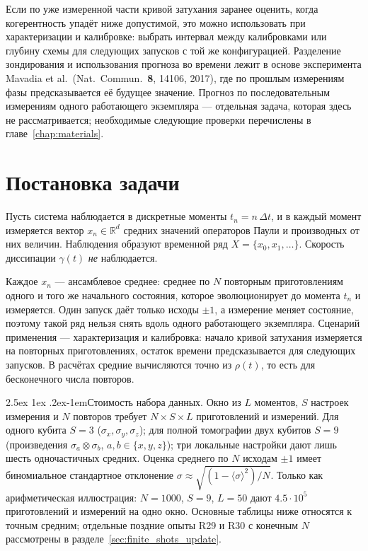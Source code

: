 \documentclass[12pt,a4paper]{report}
\makeatletter
\renewcommand\paragraph{\@startsection{paragraph}{4}{\z@}%
  {2.5ex \@plus1ex \@minus.2ex}{-1em}{\normalfont\normalsize\bfseries}}
\numberwithin{equation}{chapter}
\makeatother
\begin{document}
Если по уже измеренной части кривой затухания заранее оценить, когда
когерентность упадёт ниже допустимой, это можно использовать при
характеризации и калибровке: выбрать интервал между калибровками или глубину
схемы для следующих запусков с той же конфигурацией. Разделение зондирования и
использования прогноза во времени лежит в основе эксперимента Mavadia et al.\
(Nat.\ Commun.\ \textbf{8}, 14106, 2017), где по прошлым измерениям фазы
предсказывается её будущее значение. Прогноз по последовательным измерениям
одного работающего экземпляра --- отдельная задача, которая здесь не
рассматривается; необходимые следующие проверки перечислены в
главе~\ref{chap:materials}.

\section{Постановка задачи}

Пусть система наблюдается в дискретные моменты $t_n=n\,\Delta t$, и в каждый
момент измеряется вектор $x_n\in\mathbb R^d$ средних значений операторов
Паули и производных от них величин. Наблюдения образуют временной ряд
$X=\{x_0,x_1,\dots\}$. Скорость диссипации $\gamma(t)$ \emph{не} наблюдается.

Каждое $x_n$ --- ансамблевое среднее: среднее по $N$ повторным приготовлениям
одного и того же начального состояния, которое эволюционирует до момента $t_n$
и измеряется. Один запуск даёт только исходы $\pm1$, а измерение меняет
состояние, поэтому такой ряд нельзя снять вдоль одного работающего
экземпляра. Сценарий применения --- характеризация и калибровка: начало
кривой затухания измеряется на повторных приготовлениях, остаток времени
предсказывается для следующих запусков. В расчётах средние вычисляются точно
из $\rho(t)$, то есть для бесконечного числа повторов.

\paragraph{Стоимость набора данных.}\label{sec:intro_cost} Окно из $L$ моментов, $S$ настроек
измерения и $N$ повторов требует $N\times S\times L$ приготовлений и
измерений. Для одного кубита $S=3$ ($\sigma_x,\sigma_y,\sigma_z$); для полной
томографии двух кубитов $S=9$ (произведения $\sigma_a\otimes\sigma_b$,
$a,b\in\{x,y,z\}$); три локальные настройки дают лишь шесть одночастичных
средних. Оценка среднего по $N$ исходам $\pm1$ имеет биномиальное стандартное
отклонение $\sigma\approx\sqrt{(1-\langle\sigma\rangle^2)/N}$. Только как
арифметическая иллюстрация: $N=1000$, $S=9$, $L=50$ дают
$4.5\cdot10^{5}$ приготовлений и измерений на одно окно. Основные таблицы
ниже относятся к точным средним; отдельные поздние опыты R29 и R30 с
конечным $N$ рассмотрены в разделе~\ref{sec:finite_shots_update}.
\end{document}
